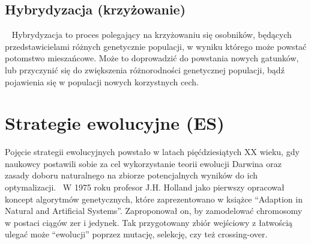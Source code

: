 \documentclass[twoside,a4paper,10]{book}
\begin{document}
 \subsection{ Hybrydyzacja (krzyżowanie) } ~\label{sec:hybryda}
Hybrydyzacja to proces polegający na krzyżowaniu się osobników, będących przedstawicielami różnych genetycznie populacji, w wyniku którego może powstać potomstwo mieszańcowe. Może to doprowadzić do powstania nowych gatunków, lub przyczynić się do zwiększenia różnorodności genetycznej populacji, bądź pojawienia się w populacji nowych korzystnych cech.~\cite{hybry}
\section{ Strategie ewolucyjne (ES) }
Pojęcie strategii ewolucyjnych powstało w latach pięćdziesiątych XX wieku, gdy naukowcy postawili sobie za cel wykorzystanie teorii ewolucji Darwina  oraz zasady doboru naturalnego na zbiorze potencjalnych wyników do ich optymalizacji.~\cite{javaGen} 
W 1975 roku profesor J.H. Holland jako pierwszy opracował koncept algorytmów genetycznych, które zaprezentowano w książce “Adaption in Natural and Artificial Systems”. Zaproponował on, by zamodelować chromosomy w postaci ciągów zer i jedynek. Tak przygotowany zbiór wejściowy z łatwością ulegać może “ewolucji” poprzez mutację, selekcję, czy też crossing-over.~\cite{javaGen}
\end{document}
